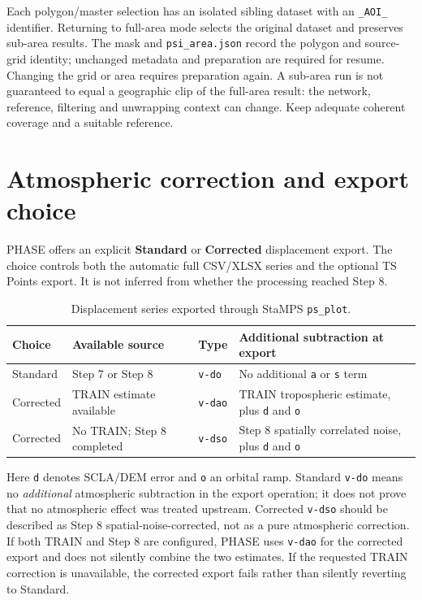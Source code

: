 Each polygon/master selection has an isolated sibling dataset with an \texttt{\_AOI\_} identifier. Returning to full-area mode selects the original dataset and preserves sub-area results. The mask and \texttt{psi\_area.json} record the polygon and source-grid identity; unchanged metadata and preparation are required for resume. Changing the grid or area requires preparation again. A sub-area run is not guaranteed to equal a geographic clip of the full-area result: the network, reference, filtering and unwrapping context can change. Keep adequate coherent coverage and a suitable reference.

\section{Atmospheric correction and export choice}\label{ss:tropo}
PHASE offers an explicit \textbf{Standard} or \textbf{Corrected} displacement export. The choice controls both the automatic full CSV/XLSX series and the optional TS Points export. It is not inferred from whether the processing reached Step 8.

\begin{table}[htbp]
\centering
\caption{Displacement series exported through StaMPS \texttt{ps\_plot}.}
\begin{tabular}{@{}p{2.4cm}p{4.2cm}p{1.6cm}p{4.2cm}@{}}
\toprule
\textbf{Choice} & \textbf{Available source} & \textbf{Type} & \textbf{Additional subtraction at export} \\
\midrule
Standard & Step 7 or Step 8 & \texttt{v-do} & No additional \texttt{a} or \texttt{s} term \\
Corrected & TRAIN estimate available & \texttt{v-dao} & TRAIN tropospheric estimate, plus \texttt{d} and \texttt{o} \\
Corrected & No TRAIN; Step 8 completed & \texttt{v-dso} & Step 8 spatially correlated noise, plus \texttt{d} and \texttt{o} \\
\bottomrule
\end{tabular}
\end{table}

Here \texttt{d} denotes SCLA/DEM error and \texttt{o} an orbital ramp. Standard \texttt{v-do} means no \emph{additional} atmospheric subtraction in the export operation; it does not prove that no atmospheric effect was treated upstream. Corrected \texttt{v-dso} should be described as Step 8 spatial-noise-corrected, not as a pure atmospheric correction. If both TRAIN and Step 8 are configured, PHASE uses \texttt{v-dao} for the corrected export and does not silently combine the two estimates. If the requested TRAIN correction is unavailable, the corrected export fails rather than silently reverting to Standard.

